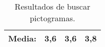 \begin{table}[H]
{\begin{tabular}{c|ccc|}
            \multicolumn{1}{|c|}{\textbf{Media:}}    & \multicolumn{1}{c|}{\textbf{3,6}}                                                                                                                                            & \multicolumn{1}{c|}{\textbf{3,6}}                                                                                                                                                                     & \textbf{3,8}                                                                                                                                                                                                         \\ \hline
        \end{tabular}
    }
    \caption{Resultados de buscar pictogramas.}
    \label{tab:resultadosBuscarPictogramas}
\end{table}


